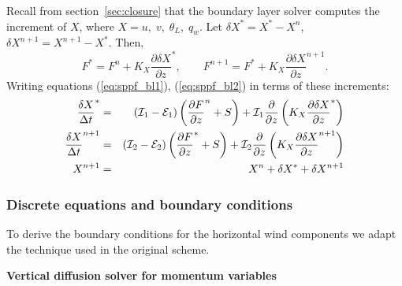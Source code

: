 \documentclass{UMDP_article}
\begin{document}
Recall from section~\ref{sec:closure} that the boundary layer solver
computes the increment of $X$, where $X=u,\; v,\;\theta_{L},\; q_{w}$.
Let $\delta X^{*}=X^{*}-X^{n}$, $\delta
X^{n+1}=X^{n+1}-X^{*}$. Then,
\begin{equation*}
  F^{*}=F^{n}+K_{X}\frac{\partial\delta X}{\partial z}^{*},\qquad 
  F^{n+1}=F^{*}+K_{X}\frac{\partial\delta X}{\partial z}^{n+1}.
\end{equation*}
Writing equations (\ref{eq:sppf_bl1}),
(\ref{eq:sppf_bl2}) in terms of these increments:
\begin{eqnarray}
  \frac{\delta X}{\Delta t}^{*} & = & ({\cal I}_{1}-{\cal E}_{1})\left(\frac{\partial F}{\partial z}^{n}+S\right)+{\cal I}_{1}\frac{\partial}{\partial z}\left(K_{X}\frac{\partial\delta X}{\partial z}^{*}\right)\label{eq:sppf_inc1}\\
  \frac{\delta X}{\Delta t}^{n+1} & = & ({\cal I}_{2}-{\cal E}_{2})\left(\frac{\partial F}{\partial z}^{*}+S\right)+{\cal I}_{2}\frac{\partial}{\partial z}\left(K_{X}\frac{\partial\delta X}{\partial z}^{n+1}\right)\label{eq:sppf_inc2}\\
  X^{n+1} & = & X^{n}+\delta X^{*}+\delta X^{n+1}\label{eq:sppf_inc3}
\end{eqnarray}

\subsubsection{Discrete equations and boundary conditions}
\label{sec:impsolve}

To derive the boundary conditions for the horizontal wind components
we adapt the technique used in the original scheme.

\noindent
{\bf Vertical diffusion solver for momentum variables }
\end{document}
